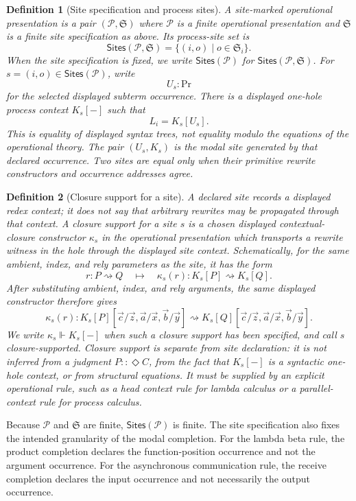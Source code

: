 \documentclass[11pt]{article}
\newcommand{\Proc}{\mathrm{Pr}}
\newcommand{\rw}{\rightsquigarrow}
\newcommand{\ty}{\mathrel{::}}
\newcommand{\Dia}{\Diamond}
\newcommand{\Sites}{\mathsf{Sites}}
\newtheorem{definition}{Definition}[section]
\begin{document}
\begin{definition}[Site specification and process sites]
A site-marked operational presentation is a pair \((\mathcal{P},\mathfrak{S})\)
where \(\mathcal{P}\) is a finite operational presentation and \(\mathfrak{S}\)
is a finite site specification as above.  Its process-site set is
\[
  \Sites(\mathcal{P},\mathfrak{S})
  =
  \{(i,o)\mid o\in\mathfrak{S}_i\}.
\]
When the site specification is fixed, we write \(\Sites(\mathcal{P})\) for
\(\Sites(\mathcal{P},\mathfrak{S})\).  For \(s=(i,o)\in\Sites(\mathcal{P})\),
write
\[
  U_s:\Proc
\]
for the selected displayed subterm occurrence. There is a displayed one-hole
process context \(K_s[-]\) such that
\[
  L_i = K_s[U_s].
\]
This is equality of displayed syntax trees, not equality modulo the equations of the operational theory.  The pair \((U_s,K_s)\) is the modal site generated by that declared occurrence. Two sites are equal only when their primitive rewrite constructors and occurrence addresses agree.
\end{definition}

\begin{definition}[Closure support for a site]
\label{def:closure-support}
A declared site records a displayed redex context; it does not say that
arbitrary rewrites may be propagated through that context.  A \emph{closure
support} for a site \(s\) is a chosen displayed contextual-closure constructor
\(\kappa_s\) in the operational presentation which transports a rewrite witness
in the hole through the displayed site context.  Schematically, for the same
ambient, index, and rely parameters as the site, it has the form
\[
  r:P\rw Q
  \quad\longmapsto\quad
  \kappa_s(r):K_s[P]\rw K_s[Q].
\]
After substituting ambient, index, and rely arguments, the same displayed constructor
therefore gives
\[
  \kappa_s(r):
  K_s[P][\vec c/\vec z,\vec a/\vec x,\vec b/\vec y]
  \rw
  K_s[Q][\vec c/\vec z,\vec a/\vec x,\vec b/\vec y].
\]
We write \(\kappa_s\Vdash K_s[-]\) when such a closure support has been
specified, and call \(s\) \emph{closure-supported}.  Closure support is separate
from site declaration: it is not inferred from a judgment \(P\ty\Dia C\), from
the fact that \(K_s[-]\) is a syntactic one-hole context, or from structural
equations.  It must be supplied by an explicit operational rule, such as a head
context rule for lambda calculus or a parallel-context rule for process
calculus.
\end{definition}

Because \(\mathcal{P}\) and \(\mathfrak{S}\) are finite, \(\Sites(\mathcal{P})\)
is finite.  The site specification also fixes the intended granularity of the
modal completion.  For the lambda beta rule, the product completion declares the
function-position occurrence and not the argument occurrence.  For the
asynchronous communication rule, the receive completion declares the input
occurrence and not necessarily the output occurrence.
\end{document}
